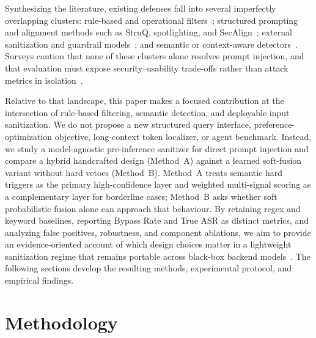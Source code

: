 \documentclass{article}
\begin{document}
Synthesizing the literature, existing defenses fall into several imperfectly overlapping clusters: rule-based and operational filters~\cite{openrouter2026promptinjection,getstream2024prompt,mend2024prompt}; structured prompting and alignment methods such as StruQ, spotlighting, and SecAlign~\cite{struq2024,hines2024spotlighting,secalign2024}; external sanitization and guardrail models~\cite{geng2025pisanitizer,shi2025promptarmor,chowdhury2025prepsilonepsilonmptsanitizingsensitiveprompts}; and semantic or context-aware detectors~\cite{wang2025promptsleuth,kholkar2025capture}.
Surveys caution that none of these clusters alone resolves prompt injection, and that evaluation must expose security--usability trade-offs rather than attack metrics in isolation~\cite{correia2026systematic,bair2025prompt,11359704,zizzo2025adversarial}.

Relative to that landscape, this paper makes a focused contribution at the intersection of rule-based filtering, semantic detection, and deployable input sanitization.
We do not propose a new structured query interface, preference-optimization objective, long-context token localizer, or agent benchmark.
Instead, we study a model-agnostic pre-inference sanitizer for direct prompt injection and compare a hybrid handcrafted design (Method~A) against a learned soft-fusion variant without hard vetoes (Method~B).
Method~A treats semantic hard triggers as the primary high-confidence layer and weighted multi-signal scoring as a complementary layer for borderline cases; Method~B asks whether soft probabilistic fusion alone can approach that behaviour.
By retaining regex and keyword baselines, reporting Bypass Rate and True ASR as distinct metrics, and analyzing false positives, robustness, and component ablations, we aim to provide an evidence-oriented account of which design choices matter in a lightweight sanitization regime that remains portable across black-box backend models~\cite{zizzo2025adversarial,bair2025prompt,correia2026systematic}.
The following sections develop the resulting methods, experimental protocol, and empirical findings.



\section{Methodology}
\label{sec:methodology}
\end{document}
